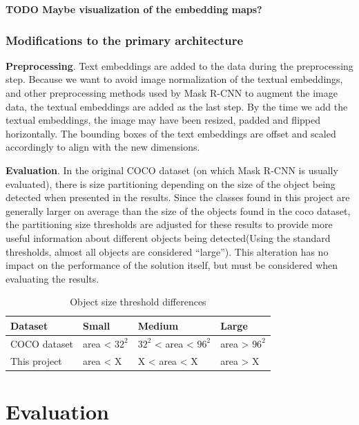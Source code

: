 \documentclass[english, bibtex]{kththesis}
\begin{document}
\textbf{TODO Maybe visualization of the embedding maps?}

\subsection{Modifications to the primary architecture}

\textbf{Preprocessing}. Text embeddings are added to the data during the preprocessing step. Because we want to avoid image normalization of the textual embeddings, and other preprocessing methods used by Mask R-CNN to augment the image data, the textual embeddings are added as the last step. By the time we add the textual embeddings, the image may have been resized, padded and flipped horizontally. The bounding boxes of the text embeddings are offset and scaled accordingly to align with the new dimensions.

\textbf{Evaluation}. In the original COCO dataset (on which Mask R-CNN is usually evaluated), there is size partitioning depending on the size of the object being detected when presented in the results. Since the classes found in this project are generally larger on average than the size of the objects found in the coco dataset, the partitioning size thresholds are adjusted for these results to provide more useful information about different objects being detected(Using the standard thresholds, almost all objects are considered “large”). This alteration has no impact on the performance of the solution itself, but must be considered when evaluating the results.

\begin{table}[!ht]
  \begin{center}
    \caption{Object size threshold differences}
    \label{tab:objectsizes}
    \begin{tabular}{l|l|l|l} %
    \textbf{Dataset} & \textbf{Small} & \textbf{Medium} & \textbf{Large}  \\ 
    \hline
    COCO dataset & area < $32^2$ & $32^2$ < area < $96^2$ & area > $96^2$  \\    \hline
    This project & area < X & X < area < X & area > X \\    \hline
    \end{tabular}
  \end{center}
\end{table}


\chapter{Evaluation}
\label{ch:eval}
\end{document}
